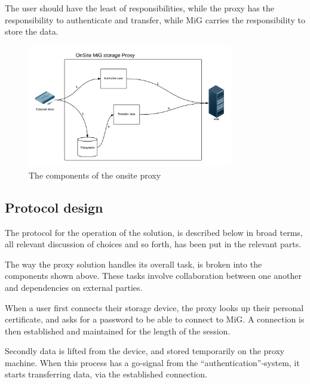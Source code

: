 The user should have the least of responsibilities, while the proxy has the
responsibility to authenticate and transfer, while MiG carries the
responsibility to store the data.

\begin{figure}[h]
\centering
\includegraphics[width=0.8\textwidth]{MiG_ProxyBox}
\caption{The components of the onsite proxy}
\label{fig:proxy_components}
\end{figure}

\subsection{Protocol design}
The protocol for the operation of the solution, is described below in broad
terms, all relevant discussion of choices and so forth, has been put in the
relevant parts.

The way the proxy solution handles its overall task, is broken into the
components shown above. These tasks involve collaboration between one
another and dependencies on external parties.

When a user first connects their storage device, the proxy looks up their
personal certificate, and asks for a password to be able to connect to MiG. A
connection is then established and maintained for the length of the session.

Secondly data is lifted from the device, and stored temporarily on the proxy
machine. When this process has a go-signal from the ``authentication''-system, 
it starts transferring data, via the established connection.

